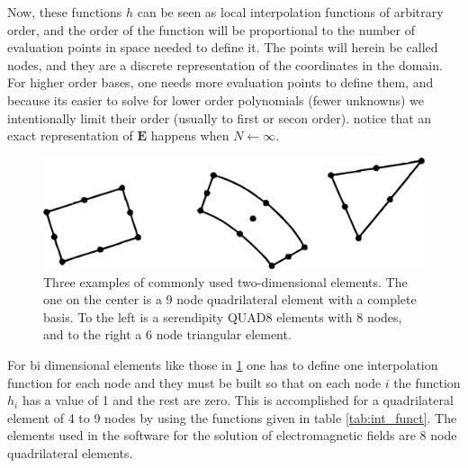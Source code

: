 Now, these functions $h$ can be seen as local interpolation functions of arbitrary order, and the order of the function will be proportional to the number of evaluation points in space needed to define it. The points will herein be called nodes, and they are a discrete representation of the coordinates in the domain. For higher order bases, one needs more evaluation points to define them, and because its easier to solve for lower order polynomials (fewer unknowns) we intentionally limit their order (usually to first or secon order). notice that an exact representation of $\mathbf{E}$ happens when $N\leftarrow\infty$.

\begin{figure}
\centering
\includegraphics[scale=0.5]{./img/two_dim_elem.pdf}
\caption{Three examples of commonly used two-dimensional elements. The one on the center is a 9 node quadrilateral element with a complete basis. To the left is a serendipity QUAD8 elements with 8 nodes, and to the right a 6 node triangular element.\cite{Bathe1996}}
\label{fig:2d_elem}
\end{figure}

For bi dimensional elements like those in \ref{fig:2d_elem} one has to define one interpolation function for each node and they must be built so that on each node $i$ the function $h_i$ has a value of 1 and the rest are zero. This is accomplished for a quadrilateral element of 4 to 9 nodes by using the functions given in table \ref{tab:int_funct}. The elements used in the software for the solution of electromagnetic fields are 8 node quadrilateral elements.

